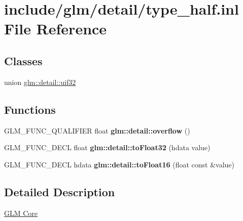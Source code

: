 \hypertarget{type__half_8inl}{}\section{include/glm/detail/type\+\_\+half.inl File Reference}
\label{type__half_8inl}
\subsection*{Classes}
\begin{DoxyCompactItemize}
\item 
union \hyperlink{unionglm_1_1detail_1_1uif32}{glm\+::detail\+::uif32}
\end{DoxyCompactItemize}
\subsection*{Functions}
\begin{DoxyCompactItemize}
\item 
\mbox{\label{type__half_8inl_a61efe122333bc00e81c57e0927bfdfb3}} 
G\+L\+M\+\_\+\+F\+U\+N\+C\+\_\+\+Q\+U\+A\+L\+I\+F\+I\+ER float {\bfseries glm\+::detail\+::overflow} ()
\item 
\mbox{\label{type__half_8hpp_a8e4719d94d99ee1e625496e04317272b}} 
G\+L\+M\+\_\+\+F\+U\+N\+C\+\_\+\+D\+E\+CL float {\bfseries glm\+::detail\+::to\+Float32} (hdata value)
\item 
\mbox{\label{type__half_8hpp_ac16321696a34b41c55f941b319d50652}} 
G\+L\+M\+\_\+\+F\+U\+N\+C\+\_\+\+D\+E\+CL hdata {\bfseries glm\+::detail\+::to\+Float16} (float const \&value)
\end{DoxyCompactItemize}


\subsection{Detailed Description}
\hyperlink{group__core}{G\+LM Core} 